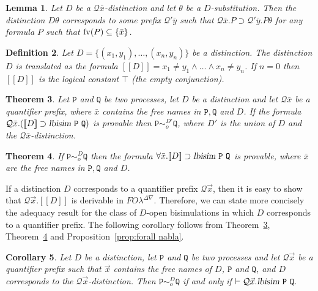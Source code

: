 \documentclass{acmtrans2m}
\newenvironment{definition}{\begin{define} \rm}{\end{define}}
\newtheorem{theorem}{Theorem}
\newtheorem{corollary}[theorem]{Corollary}
\newtheorem{define}[theorem]{Definition}
\newtheorem{lemma}[theorem]{Lemma}
\def\Qscr{{\mathcal Q}}
\def\Ppi{{\mathtt P}}
\def\Qpi{{\mathtt Q}}
\newcommand{\FOL   }{FO\lambda}
\newcommand{\FOLDNb}{\FOL^{\Delta\nabla}}
\newcommand{\llbra}{[\![}
\newcommand{\rrbra}{]\!]}
\newcommand{\lbisim}[2]{\hbox{\sl lbisim}~#1~#2}
\newcommand{\fv}[1]{{\rm fv}(#1)}
\newcommand{\oimp}{\supset}
\begin{document}
\begin{lemma}
\label{lm:prefix}
Let $D$ be a $\Qscr\bar{x}$-distinction and let $\theta$
be a $D$-substitution. Then the distinction $D\theta$
corresponds to some prefix $\Qscr'\bar{y}$ such that
$\Qscr\bar{x}.P \oimp \Qscr'\bar{y}.P\theta$ for any 
formula $P$ such that $\fv{P} \subseteq \{ \bar x\}$.
\end{lemma}

\begin{definition}
Let $D = \{ (x_1,y_1), \dots, (x_n, y_n) \}$ be a distinction.  The
distinction $D$ is translated as the formula $\llbra D\rrbra = x_1
\not = y_1 \land \dots \land x_n \not = y_n$.  If $n = 0$ then $\llbra
D \rrbra$ is the logical constant $\top$ (the empty conjunction).
\end{definition}


\begin{theorem}
\label{thm:open bisim sound}
Let $\Ppi$ and $\Qpi$ be two processes, let $D$ be a distinction and
let $\Qscr \bar{x}$ be a quantifier prefix, where $\bar{x}$ contains
the free names in $\Ppi, \Qpi$ and $D$.
If the formula 
$
\Qscr \bar{x}. (\llbra D \rrbra \oimp \lbisim \Ppi \Qpi)
$
is provable then $\Ppi \sim^{D'}_o \Qpi$, where $D'$ is the union of
$D$ and the $\Qscr\bar{x}$-distinction.
\end{theorem}

\begin{theorem}
\label{thm:open bisim complete}
If $\Ppi \sim^D_o \Qpi$ then the formula
$\forall \bar{x}. \llbra D \rrbra \oimp \lbisim \Ppi \Qpi$ is provable, where $\bar{x}$
are the free names in $\Ppi, \Qpi$ and $D$.
\end{theorem}

If a distinction $D$ corresponds to a quantifier prefix $\Qscr \vec x$, 
then it is easy to show that $\Qscr \vec x.\llbra D \rrbra$ is derivable in $\FOLDNb.$
Therefore, we can state more concisely the adequacy result for the class of 
$D$-open bisimulations in which $D$ corresponds to a quantifier
prefix.  The following
corollary follows from Theorem~\ref{thm:open bisim sound}, 
Theorem~\ref{thm:open bisim complete} and Proposition~\ref{prop:forall nabla}. 

\begin{corollary}
\label{cor:open bisim prefix}
Let $D$ be a distinction, let $\Ppi$ and $\Qpi$ be two processes and let $\Qscr \vec x$
be a quantifier prefix such that $\vec x$ contains the free names of $D$, $\Ppi$ and $\Qpi$,
and $D$ corresponds to the $\Qscr \vec x$-distinction. Then
$\Ppi \sim^D_o \Qpi$ if and only if $\vdash \Qscr \vec x. \lbisim \Ppi \Qpi.$
\end{corollary}
\end{document}
